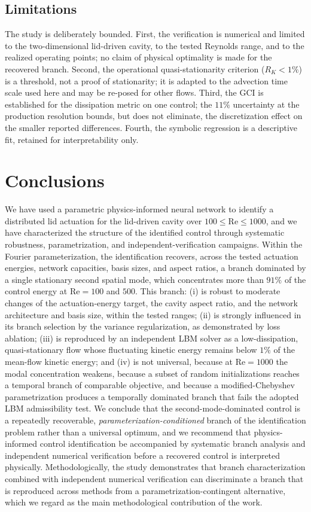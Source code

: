 \documentclass[aip,pof,reprint,superscriptaddress]{revtex4-2}
\newcommand{\re}{\mathrm{Re}}
\begin{document}
\subsection{Limitations}

The study is deliberately bounded. First, the verification is numerical and limited to the two-dimensional lid-driven cavity, to the tested Reynolds range, and to the realized operating points; no claim of physical optimality is made for the recovered branch. Second, the operational quasi-stationarity criterion ($R_K<1\%$) is a threshold, not a proof of stationarity; it is adapted to the advection time scale used here and may be re-posed for other flows. Third, the GCI is established for the dissipation metric on one control; the $11\%$ uncertainty at the production resolution bounds, but does not eliminate, the discretization effect on the smaller reported differences. Fourth, the symbolic regression is a descriptive fit, retained for interpretability only.

\section{Conclusions}\label{sec:conclusions}

We have used a parametric physics-informed neural network to identify a distributed lid actuation for the lid-driven cavity over $100\le\re\le1000$, and we have characterized the structure of the identified control through systematic robustness, parametrization, and independent-verification campaigns. Within the Fourier parameterization, the identification recovers, across the tested actuation energies, network capacities, basis sizes, and aspect ratios, a branch dominated by a single stationary second spatial mode, which concentrates more than $91\%$ of the control energy at $\re=100$ and $500$. This branch: (i) is robust to moderate changes of the actuation-energy target, the cavity aspect ratio, and the network architecture and basis size, within the tested ranges; (ii) is strongly influenced in its branch selection by the variance regularization, as demonstrated by loss ablation; (iii) is reproduced by an independent LBM solver as a low-dissipation, quasi-stationary flow whose fluctuating kinetic energy remains below $1\%$ of the mean-flow kinetic energy; and (iv) is not universal, because at $\re=1000$ the modal concentration weakens, because a subset of random initializations reaches a temporal branch of comparable objective, and because a modified-Chebyshev parametrization produces a temporally dominated branch that fails the adopted LBM admissibility test. We conclude that the second-mode-dominated control is a repeatedly recoverable, \emph{parameterization-conditioned} branch of the identification problem rather than a universal optimum, and we recommend that physics-informed control identification be accompanied by systematic branch analysis and independent numerical verification before a recovered control is interpreted physically. Methodologically, the study demonstrates that branch characterization combined with independent numerical verification can discriminate a branch that is reproduced across methods from a parametrization-contingent alternative, which we regard as the main methodological contribution of the work.
\end{document}
